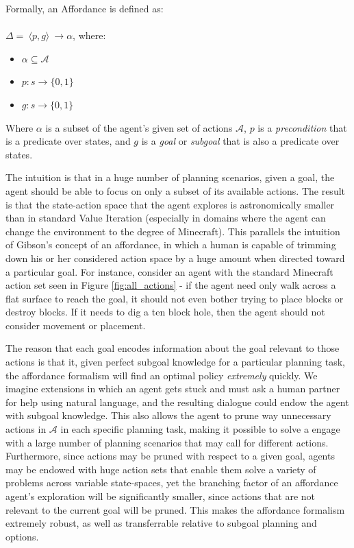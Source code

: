 \documentclass[]{article}
\begin{document}
Formally, an Affordance is defined as: \\ \\
\vspace{1 mm} $\Delta =\ \langle p,g\rangle\ \longrightarrow \alpha$, where:

\begin{itemize}
\item[] $\alpha \subseteq \mathcal{A}$
\item[] $p : s \longrightarrow \{$0$, 1\}$
\item[] $g : s \longrightarrow \{$0$,1\}$
\end{itemize}

Where $\alpha$ is a subset of the agent's given set of actions 
$\mathcal{A}$, $p$ is a {\it precondition} that is a predicate over states, 
and $g$ is a {\it goal} or {\it subgoal} that is also a predicate over states.

The intuition is that in a huge number of planning scenarios, given a goal, the agent 
should be able to focus on only a subset of its available actions. The result is that the 
state-action space that the agent explores is astronomically smaller than in standard 
Value Iteration (especially in domains where the agent can change the environment 
to the degree of Minecraft). This parallels the intuition of Gibson's concept of an 
affordance, in which a human is capable of trimming down his or her considered 
action space by a huge amount when directed toward a particular goal. For instance, 
consider an agent with the standard Minecraft action set seen in Figure \ref{fig:all_actions} - 
if the agent need only walk across a flat surface to reach the goal, it should not 
even bother trying to place blocks or destroy blocks. If it needs to dig a ten block 
hole, then the agent should not consider movement or placement.

The reason that each goal encodes information about the goal relevant to 
those actions is that it, given perfect subgoal knowledge for a particular 
planning task, the affordance formalism will find an optimal policy {\it extremely}
 quickly. We imagine extensions in which an agent gets stuck and must ask 
 a human partner for help using natural language, and the resulting dialogue 
 could endow the agent with subgoal knowledge. This also allows the agent 
 to prune way unnecessary actions in $\mathcal{A}$ in each specific planning 
 task, making it possible to solve a engage with a large number of planning 
 scenarios that may call for different actions. Furthermore, since actions may 
 be pruned with respect to a given goal, agents may be endowed with huge 
 action sets that enable them solve a variety of problems across variable 
 state-spaces, yet the branching factor of an affordance agent's exploration 
 will be significantly smaller, since actions that are not relevant to the current 
 goal will be pruned. This makes the affordance formalism extremely robust, 
 as well as transferrable relative to subgoal planning and options.
\end{document}
